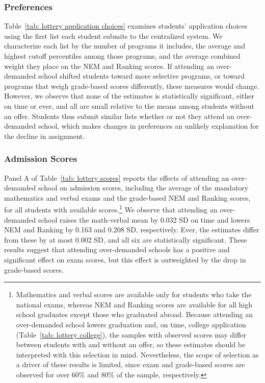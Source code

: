 \subsubsection{Preferences}\label{sec:application-choices}
Table~\ref{tab: lottery application choices} examines students' application choices using the first list each student submits to the centralized system. We characterize each list by the number of programs it includes, the average and highest cutoff percentiles among those programs, and the average combined weight they place on the NEM and Ranking scores. If attending an over-demanded school shifted students toward more selective programs, or toward programs that weigh grade-based scores differently, these measures would change. However, we observe that none of the estimates is statistically significant, either on time or ever, and all are small relative to the means among students without an offer. Students thus submit similar lists whether or not they attend an over-demanded school, which makes changes in preferences an unlikely explanation for the decline in assignment.



\subsubsection{Admission Scores}\label{sec:college-scores}

Panel A of Table~\ref{tab: lottery scores} reports the effects of attending an over-demanded school on admission scores, including the average of the mandatory mathematics and verbal exams and the grade-based NEM and Ranking scores, for all students with available scores.\footnote{Mathematics and verbal scores are available only for students who take the national exams, whereas NEM and Ranking scores are available for all high school graduates except those who graduated abroad. Because attending an over-demanded school lowers graduation and, on time, college application (Table~\ref{tab: lottery college}), the samples with observed scores may differ between students with and without an offer, so these estimates should be interpreted with this selection in mind. Nevertheless, the scope of selection as a driver of these results is limited, since exam and grade-based scores are observed for over 60\% and 80\% of the sample, respectively.}
We observe that attending an over-demanded school raises the math-verbal mean by 0.032 SD on time and lowers NEM and Ranking by 0.163 and 0.208 SD, respectively. Ever, the estimates differ from these by at most 0.002 SD, and all six are statistically significant. These results suggest that attending over-demanded schools has a positive and significant effect on exam scores, but this effect is outweighted by the drop in grade-based scores.

